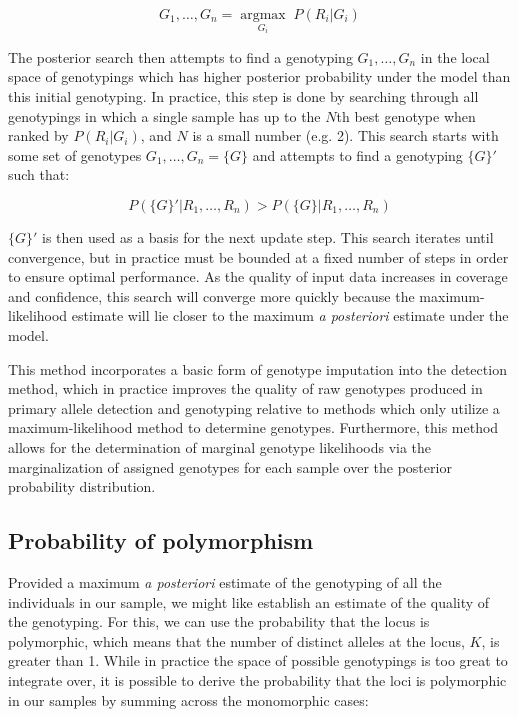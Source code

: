 \documentclass{article}
\begin{document}
\begin{equation}
G_1,\ldots,G_n =
\underset{G_i}{\operatorname{argmax}} \; P(R_i|G_i)
\end{equation}

The posterior search then attempts to find a genotyping $G_1,\ldots,G_n$ in the local space of genotypings which has higher posterior probability under the model than this initial genotyping.  In practice, this step is done by searching through all genotypings in which a single sample has up to the $N$th best genotype when ranked by $P(R_i|G_i)$, and $N$ is a small number (e.g. 2).  This search starts with some set of genotypes $G_1,\ldots,G_n = \{G\}$ and attempts to find a genotyping $\{G\}'$ such that:

\begin{equation}
P(\{G\}'|R_1,\ldots,R_n) > P(\{G\}|R_1,\ldots,R_n)
\end{equation}

$\{G\}'$ is then used as a basis for the next update step.  This search iterates until convergence, but in practice must be bounded at a fixed number of steps in order to ensure optimal performance.  As the quality of input data increases in coverage and confidence, this search will converge more quickly because the maximum-likelihood estimate will lie closer to the maximum \emph{a posteriori} estimate under the model.

This method incorporates a basic form of genotype imputation into the detection method, which in practice improves the quality of raw genotypes produced in primary allele detection and genotyping relative to methods which only utilize a maximum-likelihood method to determine genotypes.  Furthermore, this method allows for the determination of marginal genotype likelihoods via the marginalization of assigned genotypes for each sample over the posterior probability distribution.

\subsection{Probability of polymorphism}

Provided a maximum \emph{a posteriori} estimate of the genotyping of all the individuals in our sample, we might like establish an estimate of the quality of the genotyping.  For this, we can use the probability that the locus is polymorphic, which means that the number of distinct alleles at the locus, $K$, is greater than 1.  While in practice the space of possible genotypings is too great to integrate over, it is possible to derive the probability that the loci is polymorphic in our samples by summing across the monomorphic cases:
\end{document}
